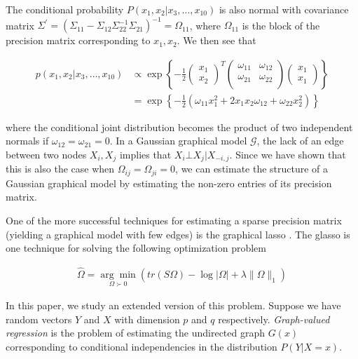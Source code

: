 \documentclass[12pt]{article}
\begin{document}
The conditional probability $P(x_1, x_2 | x_3, \ldots, x_{10})$ is also normal with covariance matrix $\Sigma^\prime = (\Sigma_{11} - \Sigma_{12} \Sigma_{22}^{-1} \Sigma_{21})^{-1} = \Omega_{11}$, where $\Omega_{11}$ is the block of the precision matrix corresponding to $x_1, x_2$. We then see that

\begin{align}
    p(x_1, x_2 | x_3, \ldots, x_{10}) &\propto \exp \left\{
      - \frac{1}{2}
      \begin{pmatrix}
        x_1 \\
        x_2
      \end{pmatrix}^T
      \begin{pmatrix}
        \omega_{11} & \omega_{12} \\
        \omega_{21} & \omega_{22} \\
      \end{pmatrix}
      \begin{pmatrix}
        x_1 \\
        x_1
      \end{pmatrix}
    \right\} \\
    &= \exp \left\{
      - \frac{1}{2}
      \left(
        \omega_{11} x_1^2 + 2 x_1 x_2 \omega_{12} + \omega_{22} x_2^2
      \right)
    \right\}
\end{align}

where the conditional joint distribution becomes the product of two independent normals if $\omega_{12} = \omega_{21} = 0$. In a Gaussian graphical model $\mathcal{G}$, the lack of an edge between two nodes $X_i, X_j$ implies that $X_i \bot X_j | X_{-i,j}$. Since we have shown that this is also the case when $\Omega_{ij} = \Omega_{ji} = 0$, we can estimate the structure of a Gaussian graphical model by estimating the non-zero entries of its precision matrix.

One of the more successful techniques for estimating a sparse precision matrix (yielding a graphical model with few edges) is the graphical lasso \cite{friedman2008}. The glasso is one technique for solving the following optimization problem

\begin{align}
\label{glasso}
    \hat{\Omega} = \underset{\Omega \succ 0}{\arg\min} \left( tr(S\Omega) - \log |\Omega| + \lambda \|\Omega\|_1 \right)
\end{align}

In this paper, we study an extended version of this problem. Suppose we have random vectors $Y$ and $X$ with dimension $p$ and $q$ respectively. \textit{Graph-valued regression} is the problem of estimating the undirected graph $G(x)$ corresponding to conditional independencies in the distribution $P(Y|X=x)$.
\end{document}
